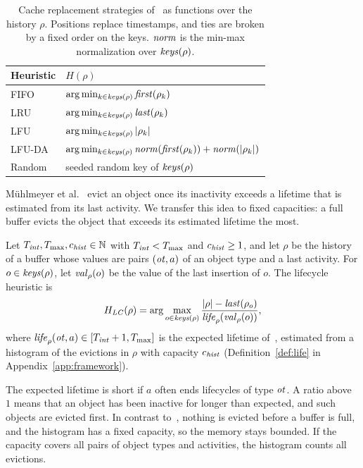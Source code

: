 \begin{table}[t]
\centering
\caption{Cache replacement strategies of~\cite{Liss2025} as functions over the
history $\rho$.
Positions replace timestamps, and ties are broken by a fixed order on the keys.
$\mathit{norm}$ is the min-max normalization over $\mathit{keys}(\rho)$.}
\label{tab:heuristics}
\begin{tabular}{@{}ll@{}}
\toprule
Heuristic & $H(\rho)$ \\
\midrule
FIFO & $\arg\min_{k \in \mathit{keys}(\rho)} \mathit{first}(\rho_k)$ \\
LRU & $\arg\min_{k \in \mathit{keys}(\rho)} \mathit{last}(\rho_k)$ \\
LFU & $\arg\min_{k \in \mathit{keys}(\rho)} |\rho_k|$ \\
LFU-DA & $\arg\min_{k \in \mathit{keys}(\rho)}
  \mathit{norm}(\mathit{first}(\rho_k)) + \mathit{norm}(|\rho_k|)$ \\
Random & seeded random key of $\mathit{keys}(\rho)$ \\
\bottomrule
\end{tabular}
\end{table}

M\"uhlmeyer et al.~\cite{Muehlmeyer2026} evict an object once its inactivity
exceeds a lifetime that is estimated from its last activity.
We transfer this idea to fixed capacities: a full buffer evicts the object
that exceeds its estimated lifetime the most.

\begin{definition}
\label{def:lifecycle}
Let $T_{\mathit{int}}, T_{\max}, c_{\mathit{hist}} \in \mathbb{N}$ with
$T_{\mathit{int}} < T_{\max}$ and $c_{\mathit{hist}} \ge 1$, and let $\rho$ be the history of a buffer whose values are pairs
$(\mathit{ot}, a)$ of an object type and a last activity.
For $o \in \mathit{keys}(\rho)$, let $\mathit{val}_\rho(o)$ be the value of the last
insertion of $o$.
The lifecycle heuristic is
\[
  H_{\mathit{LC}}(\rho) = \arg\max_{o \in \mathit{keys}(\rho)}
    \frac{|\rho| - \mathit{last}(\rho_o)}{\mathit{life}_\rho(\mathit{val}_\rho(o))},
\]
where $\mathit{life}_\rho(\mathit{ot}, a) \in [T_{\mathit{int}} + 1, T_{\max}]$ is the
expected lifetime of~\cite{Muehlmeyer2026}, estimated from a histogram of the
evictions in $\rho$ with capacity $c_{\mathit{hist}}$
(Definition~\ref{def:life} in Appendix~\ref{app:framework}).
\end{definition}

The expected lifetime is short if $a$ often ends lifecycles of type
$\mathit{ot}$.
A ratio above~$1$ means that an object has been inactive for longer than
expected, and such objects are evicted first.
In contrast to~\cite{Muehlmeyer2026}, nothing is evicted before a buffer is
full, and the histogram has a fixed capacity, so the memory stays bounded.
If the capacity covers all pairs of object types and activities, the histogram
counts all evictions.

